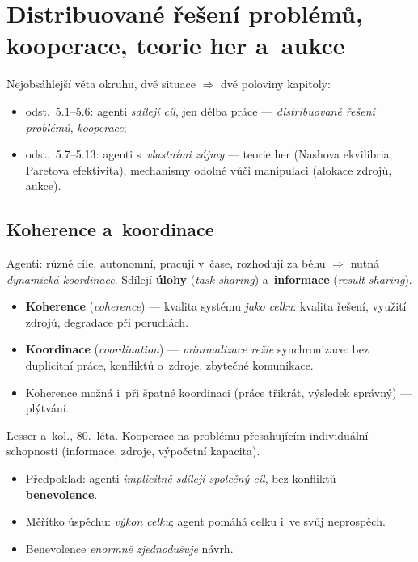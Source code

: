 \documentclass[11pt,a4paper]{article}
\theoremstyle{definition}
\begin{document}
\section{Distribuované řešení problémů, kooperace, teorie her a~aukce}
\label{sec:kooperace}

Nejobsáhlejší věta okruhu, dvě situace $\Rightarrow$ dvě poloviny kapitoly:
\begin{itemize}
\item odst.\ 5.1--5.6: agenti \emph{sdílejí cíl}, jen dělba práce --- \emph{distribuované
  řešení problémů}, \emph{kooperace};
\item odst.\ 5.7--5.13: agenti s~\emph{vlastními zájmy} --- teorie her (Nashova ekvilibria,
  Paretova efektivita), mechanismy odolné vůči manipulaci (alokace zdrojů, aukce).
\end{itemize}

\subsection{Koherence a~koordinace}

Agenti: různé cíle, autonomní, pracují v~čase, rozhodují za běhu $\Rightarrow$ nutná
\emph{dynamická koordinace}. Sdílejí \textbf{úlohy} (\emph{task sharing})
a~\textbf{informace} (\emph{result sharing}).

\begin{defbox}
\begin{itemize}
\item \textbf{Koherence} (\emph{coherence}) --- kvalita systému \emph{jako celku}: kvalita
  řešení, využití zdrojů, degradace při poruchách.
\item \textbf{Koordinace} (\emph{coordination}) --- \emph{minimalizace režie} synchronizace:
  bez duplicitní práce, konfliktů o~zdroje, zbytečné komunikace.
\item Koherence možná i~při špatné koordinaci (práce třikrát, výsledek správný) --- plýtvání.
\end{itemize}
\end{defbox}

\begin{defbox}
Lesser a~kol., 80.~léta. Kooperace na problému přesahujícím individuální schopnosti
(informace, zdroje, výpočetní kapacita).
\begin{itemize}
\item Předpoklad: agenti \emph{implicitně sdílejí společný cíl}, bez konfliktů ---
  \textbf{benevolence}.
\item Měřítko úspěchu: \emph{výkon celku}; agent pomáhá celku i~ve svůj neprospěch.
\item Benevolence \emph{enormně zjednodušuje} návrh.
\end{itemize}
\end{defbox}
\end{document}
